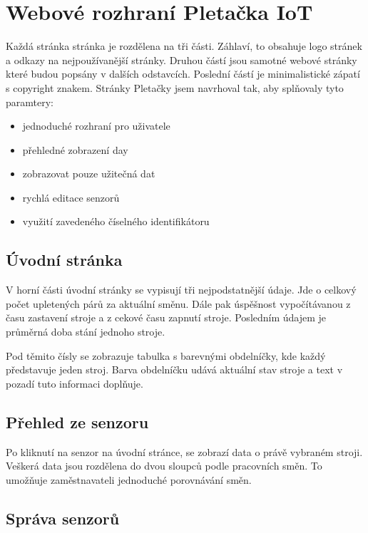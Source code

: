 \section{Webové rozhraní Pletačka IoT}
Každá stránka stránka je rozdělena na tři části. Záhlaví, to obsahuje logo stránek a odkazy na nejpoužívanější stránky.
Druhou částí jsou samotné webové stránky které budou popsány v dalších odstavcích.
Poslední částí je minimalistické zápatí s copyright znakem.\newline
Stránky Pletačky jsem navrhoval tak, aby splňovaly tyto paramtery:

\fxnote[author=JA]{\textcolor{mygreen}{Doplňit obrázky stránek pod kapitolu nebo jeden list s fotkama}}

\begin{itemize}
    \item jednoduché rozhraní pro uživatele
    \item přehledné zobrazení day
    \item zobrazovat pouze užitečná dat
    \item rychlá editace senzorů
    \item využití zavedeného číselného identifikátoru 
\end{itemize}

\subsection{Úvodní stránka}
V horní části úvodní stránky se vypisují tři nejpodstatnější údaje.
Jde o celkový počet upletených párů za aktuální směnu.
Dále pak úspěšnost vypočítávanou z času zastavení stroje a z cekové času zapnutí stroje.
Posledním údajem je průměrná doba stání jednoho stroje.   

Pod těmito čísly se zobrazuje tabulka s barevnými obdelníčky, kde každý představuje jeden stroj.
Barva obdelníčku udává aktuální stav stroje a text v pozadí tuto informaci doplňuje. 

\subsection{Přehled ze senzoru}
Po kliknutí na senzor na úvodní stránce, se zobrazí data o právě vybraném stroji.
Veškerá data jsou rozdělena do dvou sloupců podle pracovních směn.
To umožňuje zaměstnavateli jednoduché porovnávání směn.




\subsection{Správa senzorů}


